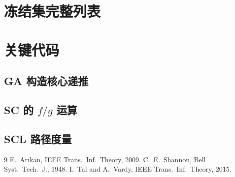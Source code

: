 \documentclass[12pt, a4paper]{article}
\begin{document}
\appendix
\section{冻结集完整列表}


\section{关键代码}
\subsection{GA 构造核心递推}


\subsection{SC 的 $f/g$ 运算}


\subsection{SCL 路径度量}


\begin{thebibliography}{9}
 E.~Ar{\i}kan, IEEE Trans.\ Inf.\ Theory, 2009.
 C.~E.~Shannon, Bell Syst.\ Tech.\ J., 1948.
 I.~Tal and A.~Vardy, IEEE Trans.\ Inf.\ Theory, 2015.
\end{thebibliography}
\end{document}
